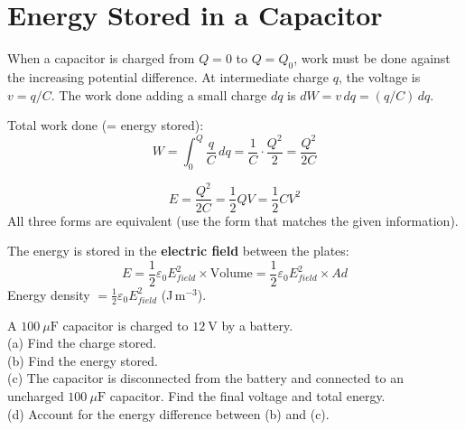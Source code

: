 \section{Energy Stored in a Capacitor}

\begin{processbox}
When a capacitor is charged from $Q=0$ to $Q=Q_0$,
work must be done against the increasing potential
difference. At intermediate charge $q$, the voltage
is $v = q/C$. The work done adding a small charge
$dq$ is $dW = v\,dq = (q/C)\,dq$.

Total work done (= energy stored):
\[
  W = \int_0^Q \frac{q}{C}\,dq
  = \frac{1}{C}\cdot\frac{Q^2}{2}
  = \frac{Q^2}{2C}
\]
\end{processbox}

\begin{lawbox}
\[
  E = \frac{Q^2}{2C} = \frac{1}{2}QV = \frac{1}{2}CV^2
\]
All three forms are equivalent (use the form that
matches the given information).

The energy is stored in the \textbf{electric field}
between the plates:
\[
  E = \frac{1}{2}\varepsilon_0 E_{field}^2 \times \text{Volume}
  = \frac{1}{2}\varepsilon_0 E_{field}^2 \times Ad
\]
Energy density $= \frac{1}{2}\varepsilon_0 E_{field}^2$
(J\,m$^{-3}$).
\end{lawbox}

\begin{examplebox}[22.2]
A $100\ \mu\text{F}$ capacitor is charged to
$12\ \text{V}$ by a battery.\\
(a) Find the charge stored.\\
(b) Find the energy stored.\\
(c) The capacitor is disconnected from the battery
and connected to an uncharged $100\ \mu\text{F}$
capacitor. Find the final voltage and total energy.\\
(d) Account for the energy difference between (b)
and (c).
\end{examplebox}

